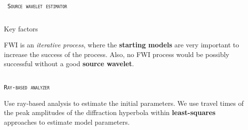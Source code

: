 \documentclass[final]{beamer}
\newlength{\onecolwid}
\newlength{\twocolwid}
\begin{document}
\begin{frame}[t]
\begin{columns}[t]
\begin{column}{\twocolwid}
\begin{columns}[t,totalwidth=\twocolwid]
\begin{column}{\onecolwid}
\begin{block}{\textsc{\texttt{ Source wavelet estimator}}}
\end{block}


\end{column} %

\end{columns} %


\begin{alertblock}{Key factors}

FWI is an \textit{iterative process}, where the \textbf{starting models} are very important to increase the success of the process. Also, no FWI process would be possibly successful without a good \textbf{source wavelet}.

\end{alertblock} 


\begin{columns}[t,totalwidth=\twocolwid] %

\begin{column}{\onecolwid} %


\begin{block}{\textsc{\texttt{Ray-based analyzer}}}

Use ray-based analysis to estimate the initial parameters. We use travel times of the peak amplitudes of the diffraction hyperbola within \textbf{least-squares} approaches to estimate model parameters.  


\end{block}
\end{column}
\end{columns}
\end{column}
\end{columns}
\end{frame}
\end{document}
